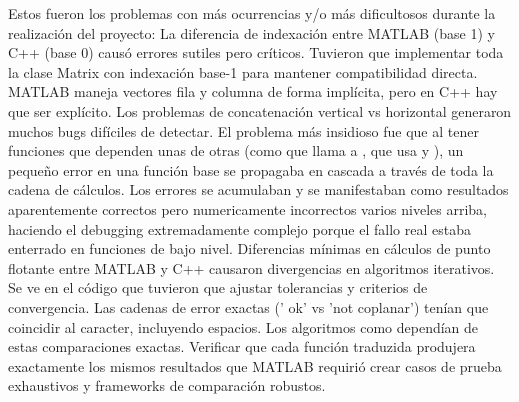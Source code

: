 \markdownRendererDocumentBegin
\markdownRendererSectionBegin
{}\markdownRendererInterblockSeparator
{}Estos fueron los problemas con más ocurrencias y/o más dificultosos durante la realización del proyecto:\markdownRendererInterblockSeparator
{}\markdownRendererSectionBegin
{}\markdownRendererInterblockSeparator
{}La diferencia de indexación entre MATLAB (base 1) y C++ (base 0) causó errores sutiles pero críticos. Tuvieron que implementar toda la clase Matrix con indexación base-1 para mantener compatibilidad directa.\markdownRendererInterblockSeparator
{}
\markdownRendererSectionEnd \markdownRendererSectionBegin
{}\markdownRendererInterblockSeparator
{}MATLAB maneja vectores fila y columna de forma implícita, pero en C++ hay que ser explícito. Los problemas de concatenación vertical vs horizontal generaron muchos bugs difíciles de detectar.\markdownRendererInterblockSeparator
{}
\markdownRendererSectionEnd \markdownRendererSectionBegin
{}\markdownRendererInterblockSeparator
{}El problema más insidioso fue que al tener funciones que dependen unas de otras (como  que llama a , que usa  y ), un pequeño error en una función base se propagaba en cascada a través de toda la cadena de cálculos. Los errores se acumulaban y se manifestaban como resultados aparentemente correctos pero numericamente incorrectos varios niveles arriba, haciendo el debugging extremadamente complejo porque el fallo real estaba enterrado en funciones de bajo nivel.\markdownRendererInterblockSeparator
{}
\markdownRendererSectionEnd \markdownRendererSectionBegin
{}\markdownRendererInterblockSeparator
{}Diferencias mínimas en cálculos de punto flotante entre MATLAB y C++ causaron divergencias en algoritmos iterativos. Se ve en el código que tuvieron que ajustar tolerancias y criterios de convergencia.\markdownRendererInterblockSeparator
{}
\markdownRendererSectionEnd \markdownRendererSectionBegin
{}\markdownRendererInterblockSeparator
{}Las cadenas de error exactas (' ok' vs 'not coplanar') tenían que coincidir al caracter, incluyendo espacios. Los algoritmos como  dependían de estas comparaciones exactas.\markdownRendererInterblockSeparator
{}
\markdownRendererSectionEnd \markdownRendererSectionBegin
{}\markdownRendererInterblockSeparator
{}Verificar que cada función traduzida produjera exactamente los mismos resultados que MATLAB requirió crear casos de prueba exhaustivos y frameworks de comparación robustos.
\markdownRendererSectionEnd 
\markdownRendererSectionEnd \markdownRendererDocumentEnd